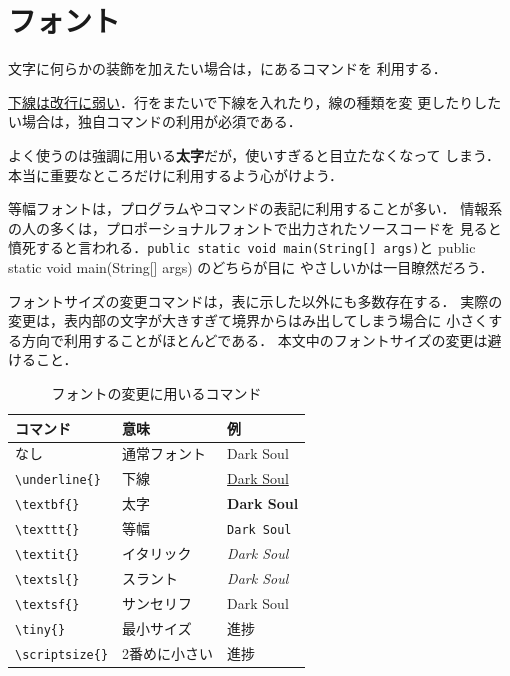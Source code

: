 \documentclass[uplatex]{jsarticle}
\begin{document}
\section{フォント}

文字に何らかの装飾を加えたい場合は，にあるコマンドを
利用する．

\underline{下線は改行に弱い}．行をまたいで下線を入れたり，線の種類を変
更したりしたい場合は，独自コマンドの利用が必須である．

よく使うのは強調に用いる\textbf{太字}だが，使いすぎると目立たなくなって
しまう．本当に重要なところだけに利用するよう心がけよう．

等幅フォントは，プログラムやコマンドの表記に利用することが多い．
情報系の人の多くは，プロポーショナルフォントで出力されたソースコードを
見ると憤死すると言われる．\texttt{public static void main(String[] args)}と
public static void main(String[] args) のどちらが目に
やさしいかは一目瞭然だろう．

フォントサイズの変更コマンドは，表に示した以外にも多数存在する．
実際の変更は，表内部の文字が大きすぎて境界からはみ出してしまう場合に
小さくする方向で利用することがほとんどである．
本文中のフォントサイズの変更は避けること．

\begin{table}
  \centering
  \caption{フォントの変更に用いるコマンド}
  \label{tab:fonts}
  \begin{tabular}[t]{l|l|l}
    \hline
    \hline
    コマンド & 意味 & 例\\
    \hline
    なし & 通常フォント & Dark Soul\\
    \verb|\underline{}| & 下線 & \underline{Dark Soul}\\
    \verb|\textbf{}| & 太字 & \textbf{Dark Soul}\\
    \verb|\texttt{}| & 等幅 & \texttt{Dark Soul}\\
    \verb|\textit{}| & イタリック & \textit{Dark Soul}\\
    \verb|\textsl{}| & スラント & \textsl{Dark Soul}\\
    \verb|\textsf{}| & サンセリフ & \textsf{Dark Soul}\\
    \hline
    \verb|\tiny{}| & 最小サイズ & \tiny{進捗}\\
    \verb|\scriptsize{}| & 2番めに小さい& \scriptsize{進捗}\\
    \hline
  \end{tabular}
\end{table}
\end{document}
